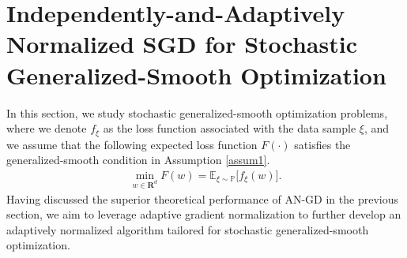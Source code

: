 \documentclass[10pt]{article} %
\begin{document}
\section{Independently-and-Adaptively Normalized SGD for Stochastic Generalized-Smooth Optimization}
In this section, we study stochastic generalized-smooth optimization problems, where we denote $f_\xi$ as the loss function associated with the data sample $\xi$, and we assume that the following expected loss function $F(\cdot)$ satisfies the generalized-smooth condition in Assumption \ref{assum1}.
\begin{align}\label{eq: sgs}
    \min_{w\in \mathbf{R}^d} F(w) = \mathbb{E}_{\xi\sim \mathbb{P}}\big[f_{\xi}(w) \big].
\end{align}
Having discussed the superior theoretical performance of AN-GD in the previous section, we aim to leverage adaptive gradient normalization to further develop an adaptively normalized algorithm tailored for stochastic generalized-smooth optimization.
\end{document}

